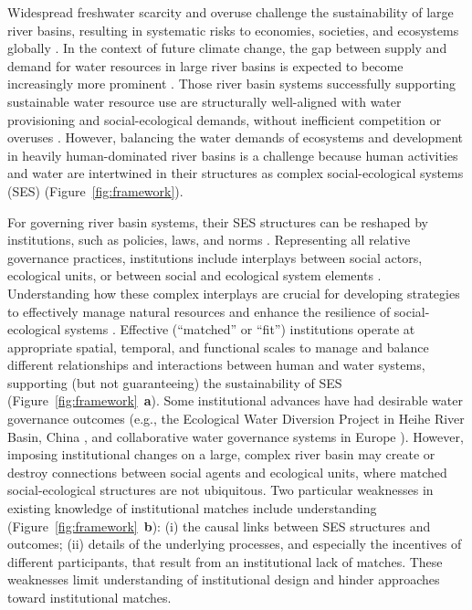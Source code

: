 Widespread freshwater scarcity and overuse challenge the sustainability of large river basins, resulting in systematic risks to economies, societies, and ecosystems globally \cite{distefano2017, dolan2021, xu2020b, mekonnen2016}.
In the context of future climate change, the gap between supply and demand for water resources in large river basins is expected to become increasingly more prominent \cite{florke2018, yoon2021}.
Those river basin systems successfully supporting sustainable water resource use are structurally well-aligned with water provisioning and social-ecological demands, without inefficient competition or overuses \cite{wang2019d}.
However, balancing the water demands of ecosystems and development in heavily human-dominated river basins is a challenge because human activities and water are intertwined in their structures as complex social-ecological systems (SES) \cite{huggins2022,konar2019} (Figure~\ref{fig:framework}).

For governing river basin systems, their SES structures can be reshaped by institutions, such as policies, laws, and norms \cite{young2008,cumming2020b}.
Representing all relative governance practices, institutions include interplays between social actors, ecological units, or between social and ecological system elements
\cite{lien2020, bodin2017b}.
Understanding how these complex interplays are crucial for developing strategies to effectively manage natural resources and enhance the resilience of social-ecological systems \cite{kluger2020}.
Effective (``matched'' or ``fit'') institutions operate at appropriate spatial, temporal, and functional scales to manage and balance different relationships and interactions between human and water systems, supporting (but not guaranteeing) the sustainability of SES \cite{epstein2015, wang2019d} (Figure~\ref{fig:framework}~\textbf{a}).
Some institutional advances have had desirable water governance outcomes (e.g., the Ecological Water Diversion Project in Heihe River Basin, China \cite{wang2019d}, and collaborative water governance systems in Europe \cite{green2013}).
However, imposing institutional changes on a large, complex river basin may create or destroy connections between social agents and ecological units, where matched social-ecological structures are not ubiquitous.
Two particular weaknesses in existing knowledge of institutional matches include understanding (Figure~\ref{fig:framework}~\textbf{b}): (i) the causal links between SES structures and outcomes; (ii) details of the underlying processes, and especially the incentives of different participants, that result from an institutional lack of matches.
These weaknesses limit understanding of institutional design and hinder approaches toward institutional matches.

